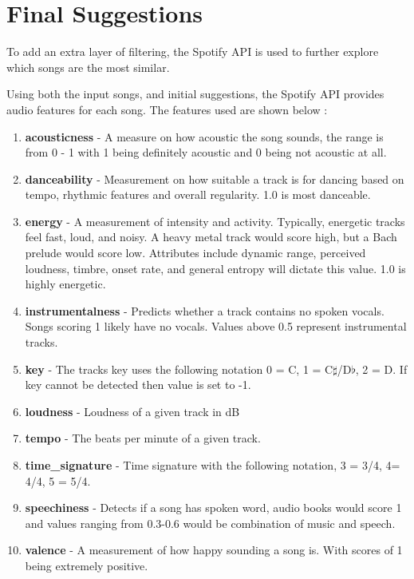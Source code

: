 \section{Final Suggestions}
To add an extra layer of filtering, the Spotify API is used to further explore which songs are the most similar.

Using both the input songs, and initial suggestions, the Spotify API provides audio features for each song. The features used are shown below \citep{spotify_web_2023}:

\begin{enumerate}
	\item \textbf{acousticness} - A measure on how acoustic the song sounds, the range is from 0 - 1 with 1 being definitely acoustic and 0 being not acoustic at all.
	\item \textbf{danceability} - Measurement on how suitable a track is for dancing based on tempo, rhythmic features and overall regularity. 1.0 is most danceable. 
	\item \textbf{energy} - A measurement of intensity and activity. Typically, energetic tracks feel fast, loud, and noisy. A heavy metal track would score high, but a Bach prelude would score low. Attributes include dynamic range, perceived loudness, timbre, onset rate, and general entropy will dictate this value. 1.0 is highly energetic.
	\item \textbf{instrumentalness} - Predicts whether a track contains no spoken vocals. Songs scoring 1 likely have no vocals. Values above 0.5 represent instrumental tracks.
	\item \textbf{key} - The tracks key uses the following notation 0 = C, 1 = C$\sharp$/D$\flat$, 2 = D. If key cannot be detected then value is set to -1.
	\item \textbf{loudness} - Loudness of a given track in dB
	\item \textbf{tempo} - The beats per minute of a given track.
	\item \textbf{time\_signature} - Time signature with the following notation, 3 = 3/4, 4= 4/4, 5 = 5/4.
	\item \textbf{speechiness} - Detects if a song has spoken word, audio books would score 1 and values ranging from 0.3-0.6 would be combination of music and speech.
	\item \textbf{valence} - A measurement of how happy sounding a song is. With scores of 1 being extremely positive.
	
\end{enumerate}

